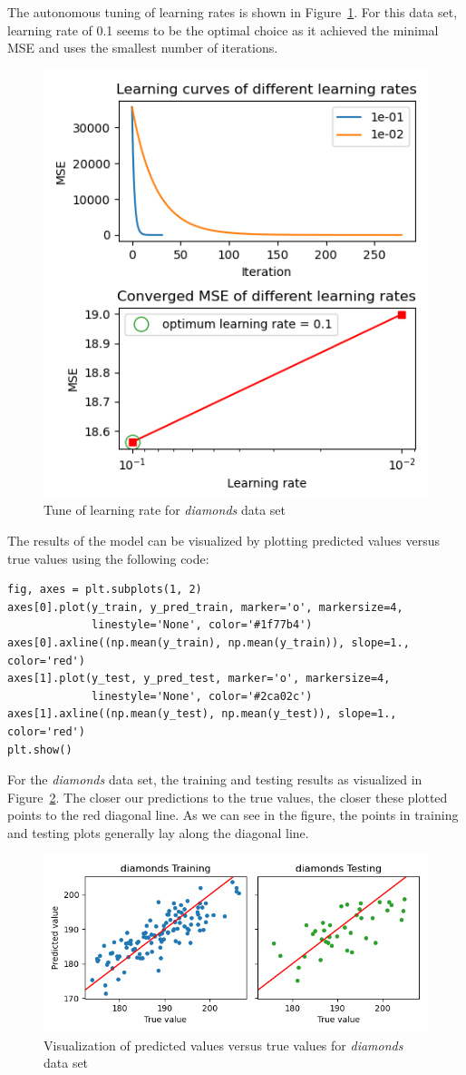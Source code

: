 \documentclass[
	letterpaper
]{article}
\begin{document}
The autonomous tuning of learning rates is shown in Figure~\ref{fig:tune_lr}.
For this data set, learning rate of 0.1 seems to be the optimal choice as it achieved the minimal MSE and uses the smallest number of iterations.
\begin{figure}[htbp]
	\centering
	\includegraphics[width=3.5 in]{figures/tune_learning_rates.png}
	\caption{Tune of learning rate for \textit{diamonds} data set}
	\label{fig:tune_lr}
\end{figure}

The results of the model can be visualized by plotting predicted values versus true values using the following code:
\begin{lstlisting}
fig, axes = plt.subplots(1, 2)
axes[0].plot(y_train, y_pred_train, marker='o', markersize=4, 
             linestyle='None', color='#1f77b4')
axes[0].axline((np.mean(y_train), np.mean(y_train)), slope=1., color='red')
axes[1].plot(y_test, y_pred_test, marker='o', markersize=4, 
             linestyle='None', color='#2ca02c')
axes[1].axline((np.mean(y_test), np.mean(y_test)), slope=1., color='red')
plt.show()
\end{lstlisting}

For the \textit{diamonds} data set, the training and testing results as visualized in Figure~\ref{fig:res_diamonds}.
The closer our predictions to the true values, the closer these plotted points to the red diagonal line.
As we can see in the figure, the points in training and testing plots generally lay along the diagonal line. 
\begin{figure}[htbp]
	\centering
	\includegraphics[width=4.2 in]{figures/res_diamonds.png}
	\caption{Visualization of predicted values versus true values for \textit{diamonds} data set}
	\label{fig:res_diamonds}
\end{figure}
\end{document}

